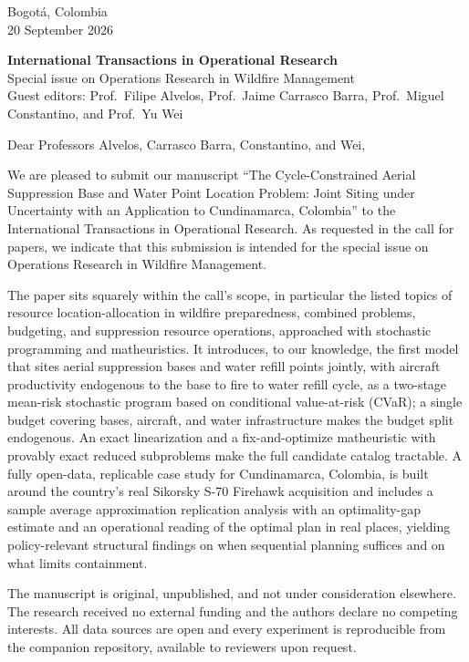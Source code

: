 \documentclass[11pt]{article}
\begin{document}
\begin{flushright}
Bogot\'a, Colombia\\
20 September 2026
\end{flushright}

\textbf{International Transactions in Operational Research}\\
Special issue on Operations Research in Wildfire Management\\
Guest editors: Prof.\ Filipe Alvelos, Prof.\ Jaime Carrasco Barra,
Prof.\ Miguel Constantino, and Prof.\ Yu Wei

\vspace{1em}

Dear Professors Alvelos, Carrasco Barra, Constantino, and Wei,

We are pleased to submit our manuscript ``The Cycle-Constrained Aerial
Suppression Base and Water Point Location Problem: Joint Siting under
Uncertainty with an Application to Cundinamarca, Colombia'' to the
International Transactions in Operational Research. As requested in
the call for papers, we indicate that this submission is intended for
the special issue on Operations Research in Wildfire Management.

The paper sits squarely within the call's scope, in particular the
listed topics of resource location-allocation in wildfire
preparedness, combined problems, budgeting, and suppression resource
operations, approached with stochastic programming and matheuristics.
It introduces, to our knowledge, the first model that sites aerial
suppression bases and water refill points jointly, with aircraft
productivity endogenous to the base to fire to water refill cycle, as
a two-stage mean-risk stochastic program based on conditional
value-at-risk (CVaR); a single budget covering bases, aircraft, and
water infrastructure makes the budget split endogenous. An exact
linearization and a fix-and-optimize matheuristic with provably exact
reduced subproblems make the full candidate catalog tractable. A
fully open-data, replicable case study for Cundinamarca, Colombia, is
built around the country's real Sikorsky S-70 Firehawk acquisition
and includes a sample average approximation replication analysis with
an optimality-gap estimate and an operational reading of the optimal
plan in real places, yielding policy-relevant structural findings on
when sequential planning suffices and on what limits containment.

The manuscript is original, unpublished, and not under consideration
elsewhere. The research received no external funding and the authors
declare no competing interests. All data sources are open and every
experiment is reproducible from the companion repository, available
to reviewers upon request.
\end{document}
